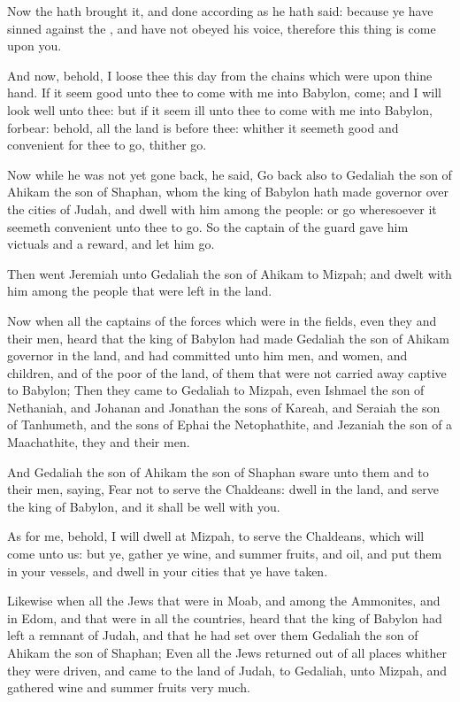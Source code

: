 \Verse Now the \LORD hath brought it, and done according as he hath said: because ye have sinned against the \LORD, and have not obeyed his voice, therefore this thing is come upon you.

\Verse And now, behold, I loose thee this day from the chains which were upon thine hand. If it seem good unto thee to come with me into Babylon, come; and I will look well unto thee: but if it seem ill unto thee to come with me into Babylon, forbear: behold, all the land is before thee: whither it seemeth good and convenient for thee to go, thither go.

\Verse Now while he was not yet gone back, he said, Go back also to Gedaliah the son of Ahikam the son of Shaphan, whom the king of Babylon hath made governor over the cities of Judah, and dwell with him among the people: or go wheresoever it seemeth convenient unto thee to go. So the captain of the guard gave him victuals and a reward, and let him go.

\Verse Then went Jeremiah unto Gedaliah the son of Ahikam to Mizpah; and dwelt with him among the people that were left in the land.

\Verse Now when all the captains of the forces which were in the fields, even they and their men, heard that the king of Babylon had made Gedaliah the son of Ahikam governor in the land, and had committed unto him men, and women, and children, and of the poor of the land, of them that were not carried away captive to Babylon; \Verse Then they came to Gedaliah to Mizpah, even Ishmael the son of Nethaniah, and Johanan and Jonathan the sons of Kareah, and Seraiah the son of Tanhumeth, and the sons of Ephai the Netophathite, and Jezaniah the son of a Maachathite, they and their men.

\Verse And Gedaliah the son of Ahikam the son of Shaphan sware unto them and to their men, saying, Fear not to serve the Chaldeans: dwell in the land, and serve the king of Babylon, and it shall be well with you.

\Verse As for me, behold, I will dwell at Mizpah, to serve the Chaldeans, which will come unto us: but ye, gather ye wine, and summer fruits, and oil, and put them in your vessels, and dwell in your cities that ye have taken.

\Verse Likewise when all the Jews that were in Moab, and among the Ammonites, and in Edom, and that were in all the countries, heard that the king of Babylon had left a remnant of Judah, and that he had set over them Gedaliah the son of Ahikam the son of Shaphan; \Verse Even all the Jews returned out of all places whither they were driven, and came to the land of Judah, to Gedaliah, unto Mizpah, and gathered wine and summer fruits very much.


